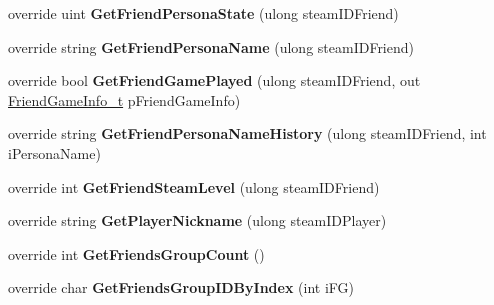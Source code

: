 \begin{DoxyCompactItemize}
\item 
\mbox{\label{class_valve_1_1_steamworks_1_1_c_steam_friends_a786b09ef13ba297d5624af18d08fac78}} 
override uint {\bfseries Get\+Friend\+Persona\+State} (ulong steam\+I\+D\+Friend)
\item 
\mbox{\label{class_valve_1_1_steamworks_1_1_c_steam_friends_a819c4ab3ae3b222aa8abea4ec14bd550}} 
override string {\bfseries Get\+Friend\+Persona\+Name} (ulong steam\+I\+D\+Friend)
\item 
\mbox{\label{class_valve_1_1_steamworks_1_1_c_steam_friends_a75eb12a588209e08ce6206e1d3d29532}} 
override bool {\bfseries Get\+Friend\+Game\+Played} (ulong steam\+I\+D\+Friend, out \hyperlink{struct_valve_1_1_steamworks_1_1_friend_game_info__t}{Friend\+Game\+Info\+\_\+t} p\+Friend\+Game\+Info)
\item 
\mbox{\label{class_valve_1_1_steamworks_1_1_c_steam_friends_a847a178c7b9f26d2bcbe69686624f273}} 
override string {\bfseries Get\+Friend\+Persona\+Name\+History} (ulong steam\+I\+D\+Friend, int i\+Persona\+Name)
\item 
\mbox{\label{class_valve_1_1_steamworks_1_1_c_steam_friends_ae9869ef23939fdf32a85763f3ff1373d}} 
override int {\bfseries Get\+Friend\+Steam\+Level} (ulong steam\+I\+D\+Friend)
\item 
\mbox{\label{class_valve_1_1_steamworks_1_1_c_steam_friends_ac92d15da6ce8993155b8e538a19a0bab}} 
override string {\bfseries Get\+Player\+Nickname} (ulong steam\+I\+D\+Player)
\item 
\mbox{\label{class_valve_1_1_steamworks_1_1_c_steam_friends_a0fac69e263b15b6b778262caf6822e48}} 
override int {\bfseries Get\+Friends\+Group\+Count} ()
\item 
\mbox{\label{class_valve_1_1_steamworks_1_1_c_steam_friends_a625f1e6ccea3ed301e734562d14087b6}} 
override char {\bfseries Get\+Friends\+Group\+I\+D\+By\+Index} (int i\+FG)

\end{DoxyCompactItemize}
